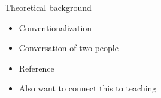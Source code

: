 \documentclass[12pt, xcolor=beamer,table,usenames,dvipsnames, ignorenonframetext, ngerman,t]{beamer}
\begin{document}



\begin{frame}{Theoretical background}
	\begin{itemize}
		\item Conventionalization
		\item Conversation of two people
		\item Reference 
		\item Also want to connect this to teaching 
	\end{itemize}
\end{frame}
\end{document}
